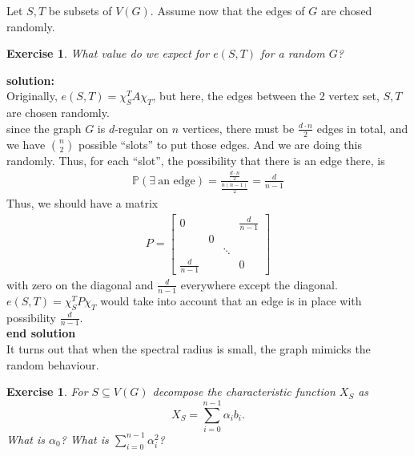 \documentclass[12pt]{article}%
\newtheorem{exercise}[theorem]{Exercise}
\begin{document}
Let $S,T$ be subsets of $V(G)$. Assume now that the edges of $G$ are chosed randomly.

\begin{exercise}
What value do we expect for $e(S,T)$ for a random $G$?
\end{exercise}

\textbf{solution:}\\
    Originally, $e(S,T) = \chi^T_S A \chi_T$,
    but here, the edges between the 2 vertex set, 
    $S,T$ are chosen randomly.\\
    since the graph $G$ is $d$-regular on $n$ vertices, 
    there must be $\frac{ d \cdot n }{ 2 }$ edges 
    in total, and we have ${n \choose 2}$ possible
    ``slots'' to put those edges. And we are 
    doing this randomly. Thus, for each ``slot'',
    the possibility that there is an edge there, is
    \begin{align}
        \mathbb{P}(\exists \ \text{an edge}) = 
        \frac{ \frac{ d \cdot n }{ 2 } }{ \frac{ n(n-1) }{ 2 } } 
        = \frac{ d }{ n-1 }
    \end{align}
    Thus, we should have a matrix 
    \begin{align}
        P = 
        \begin{bmatrix}
        0 & & & \frac{ d }{ n-1 }\\
        & 0 & & \\
        & & \ddots & \\
        \frac{ d }{ n-1 }& & &0
        \end{bmatrix}
    \end{align}
    with zero on the diagonal and $\frac{ d }{ n-1 }$ everywhere
    except the diagonal. 
    $e(S,T) = \chi_S^T P \chi_T$ would take into account that
    an edge is in place with possibility $\frac{ d }{ n-1 }$.\\
    
\textbf{end solution}\\

It turns out that when the spectral radius is small, the graph mimicks the
random behaviour.

\begin{exercise}
For $S\subseteq V(G)$ decompose the characteristic function $X_{S}$ as
\[
X_{S}=%
{\displaystyle\sum_{i=0}^{n-1}}
\alpha_{i}b_{i}\text{.}%
\]
What is $\alpha_{0}$? What is $%
{\displaystyle\sum_{i=0}^{n-1}}
\alpha_{i}^{2}$?
\end{exercise}
\end{document}
